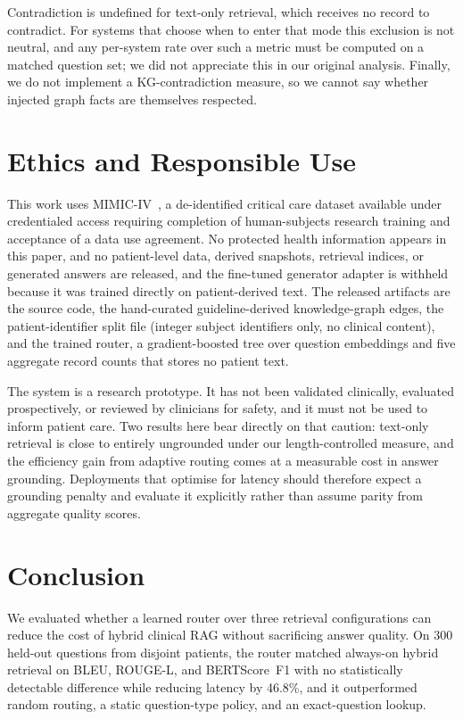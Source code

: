 \documentclass[preprint,12pt]{elsarticle}
\begin{document}
Contradiction is undefined for text-only retrieval, which receives no
record to contradict. For systems that choose when to enter that mode
this exclusion is not neutral, and any per-system rate over such a metric
must be computed on a matched question set; we did not appreciate this in
our original analysis. Finally, we do not implement a KG-contradiction
measure, so we cannot say whether injected graph facts are themselves
respected.

\section{Ethics and Responsible Use}

This work uses MIMIC-IV~\cite{mimiciv2023}, a de-identified critical
care dataset available under credentialed access requiring completion
of human-subjects research training and acceptance of a data use
agreement. No protected health information appears in this paper, and
no patient-level data, derived snapshots, retrieval indices, or
generated answers are released, and the fine-tuned generator adapter is
withheld because it was trained directly on patient-derived text. The
released artifacts are the source code, the hand-curated
guideline-derived knowledge-graph edges, the patient-identifier split
file (integer subject identifiers only, no clinical content), and the
trained router, a gradient-boosted tree over question embeddings and
five aggregate record counts that stores no patient text.

The system is a research prototype. It has not been validated
clinically, evaluated prospectively, or reviewed by clinicians for
safety, and it must not be used to inform patient care. Two results
here bear directly on that caution: text-only retrieval is close to
entirely ungrounded under our length-controlled measure, and the
efficiency gain from adaptive routing comes at a measurable cost in
answer grounding. Deployments that optimise for latency should
therefore expect a grounding penalty and evaluate it explicitly rather
than assume parity from aggregate quality scores.

\section{Conclusion}

We evaluated whether a learned router over three retrieval
configurations can reduce the cost of hybrid clinical RAG without
sacrificing answer quality. On 300 held-out questions from disjoint
patients, the router matched always-on hybrid retrieval on BLEU,
ROUGE-L, and BERTScore~F1 with no statistically detectable difference
while reducing latency by 46.8\%, and it outperformed random routing,
a static question-type policy, and an exact-question lookup.
\end{document}
